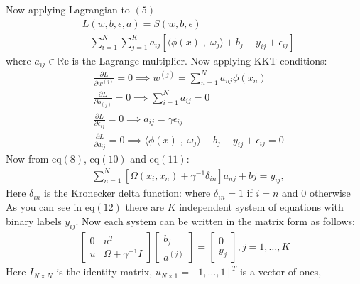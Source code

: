 \documentclass[conference]{IEEEtran}
\begin{document}
    Now applying Lagrangian to $(5)$
    \begin{align*}
        &L(w,b,\epsilon,a) = S(w,b,\epsilon)\\
        &- \sum_{i=1}^{N} \sum_{j=1}^{K} a_{ij}[\langle \phi(x) \;,\; \omega_{j}  \rangle + b_{j} - y_{ij} + \epsilon_{ij}]
    \end{align*}
    where $a_{ij} \in \mathbb{Re}$ is the Lagrange multiplier.
    Now applying KKT conditions:
    \begin{align}
        &\frac{{\partial L}}{{\partial w^{(j)}}} = 0 \implies w^{(j)} = \sum_{n=1}^{N}a_{nj}\phi(x_{n}) \\
        &\frac{{\partial L}}{{\partial b_{(j)}}} = 0 \implies \sum_{i=1}^{N}a_{ij} = 0 \\
        &\frac{{\partial L}}{{\partial \epsilon_{ij}}} = 0 \implies
        a_{ij} = \gamma \epsilon_{ij} \\
        &\frac{{\partial L}}{{\partial a_{ij}}} = 0 \implies
        \langle \phi(x) \;,\; \omega_{j}  \rangle + b_{j} - y_{ij} + \epsilon_{ij} = 0
    \end{align}
    Now from eq$(8)$, eq$(10)$ and eq$(11)$:
    \begin{align}
        &\sum_{n=1}^{N} [\Omega(x_{i},x_{n}) + \gamma^{-1}\delta_{in}]a_{nj} + b{j} = y_{ij},
    \end{align}
    Here $\delta_{in}$ is the Kronecker delta function: where $\delta_{in} =1$ if $i=n$ and $0$ otherwise \\
    As you can see in eq$(12)$ there are $K$ independent system of equations with binary labels $y_{ij}$.
    Now each system can be written in the matrix form as follows:
    \begin{align}
        \begin{bmatrix}
            0 & u^{T}                 \\
            u & \Omega + \gamma^{-1}I
        \end{bmatrix}
        \begin{bmatrix}
            b_{j} \\
            a^{(j)}
        \end{bmatrix}
        =
        \begin{bmatrix}
            0 \\
            y_{j}
        \end{bmatrix}
        , j = 1,\ldots,K
    \end{align}
    Here $I_{N \times N}$ is the identity matrix, $u_{N \times 1} = [1,\ldots,1]^{T}$ is a vector of ones,
\end{document}
